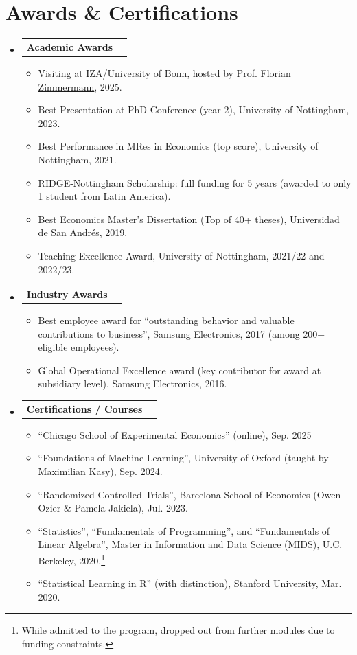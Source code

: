 \documentclass[letterpaper,11pt]{article}
\makeatletter
\newcommand{\link}[2]{{\color{NavyBlue}\href{#1}{#2}}}
\newcommand{\resumeItem}[1]{
  \item\small{
    {#1 \vspace{-2pt}}
  }
}
\newcommand{\resumeProjectHeading}[2]{
    \item
    \begin{tabular*}{0.97\textwidth}{l@{\extracolsep{\fill}}r}
      \small#1 & #2 \\
    \end{tabular*}\vspace{-7pt}
}
\newcommand{\resumeSubHeadingListStart}{\begin{itemize}[leftmargin=0.15in, label={}]}
\newcommand{\resumeSubHeadingListEnd}{\end{itemize}}
\newcommand{\resumeItemListStart}{\begin{itemize}}
\newcommand{\resumeItemListEnd}{\end{itemize}\vspace{-5pt}}
\makeatother
\begin{document}
\section{Awards \& Certifications}
    \resumeSubHeadingListStart
      \resumeProjectHeading
          {\textbf{Academic Awards}}{}
          \resumeItemListStart
            \resumeItem{Visiting at IZA/University of Bonn, hosted by Prof. \link{https://sites.google.com/site/econflorianzimmermann/}{Florian Zimmermann}, 2025.}
            \resumeItem{Best Presentation at PhD Conference (year 2), University of Nottingham, 2023.}
            \resumeItem{Best Performance in MRes in Economics (top score), University of Nottingham, 2021.}
            \resumeItem{RIDGE-Nottingham Scholarship: full funding for 5 years (awarded to only 1 student from Latin America).}
            \resumeItem{Best Economics Master's Dissertation (Top of 40+ theses), Universidad de San Andrés, 2019.}
            \resumeItem{Teaching Excellence Award, University of Nottingham, 2021/22 and 2022/23.}
          \resumeItemListEnd
      \resumeProjectHeading
          {\textbf{Industry Awards}}{}
          \resumeItemListStart
            \resumeItem{Best employee award for ``outstanding behavior and valuable contributions to business'', Samsung Electronics, 2017 (among 200+ eligible employees).}
            \resumeItem{Global Operational Excellence award (key contributor for award at subsidiary level), Samsung Electronics, 2016.}
          \resumeItemListEnd
      \resumeProjectHeading
          {\textbf{Certifications / Courses}}{}
          \resumeItemListStart
            \resumeItem{``Chicago School of Experimental Economics'' (online), Sep. 2025}
            \resumeItem{``Foundations of Machine Learning'', University of Oxford (taught by Maximilian Kasy), Sep. 2024.}
            \resumeItem{``Randomized Controlled Trials'', Barcelona School of Economics (Owen Ozier \& Pamela Jakiela), Jul. 2023.}
            \resumeItem{``Statistics'', ``Fundamentals of Programming'', and ``Fundamentals of Linear Algebra'', Master in Information and Data Science (MIDS), U.C. Berkeley, 2020.\footnote{While admitted to the program, dropped out from further modules due to funding constraints.}}
            \resumeItem{``Statistical Learning in R'' (with distinction), Stanford University, Mar. 2020.}
          \resumeItemListEnd
    \resumeSubHeadingListEnd
\end{document}
